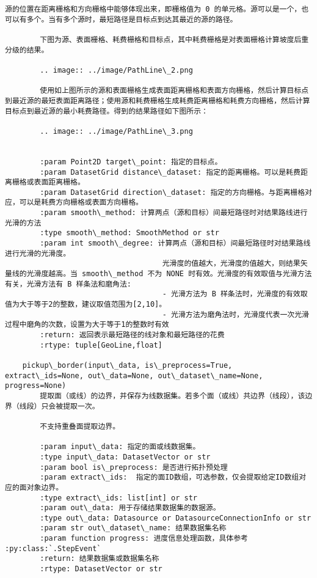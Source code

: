 \documentclass[11pt]{article}
\begin{document}
\begin{Verbatim}[commandchars=\\\{\}]
        源的位置在距离栅格和方向栅格中能够体现出来，即栅格值为 0 的单元格。源可以是一个，也可以有多个。当有多个源时，最短路径是目标点到达其最近的源的路径。
        
        下图为源、表面栅格、耗费栅格和目标点，其中耗费栅格是对表面栅格计算坡度后重分级的结果。
        
        .. image:: ../image/PathLine\_2.png
        
        使用如上图所示的源和表面栅格生成表面距离栅格和表面方向栅格，然后计算目标点到最近源的最短表面距离路径；使用源和耗费栅格生成耗费距离栅格和耗费方向栅格，然后计算目标点到最近源的最小耗费路径。得到的结果路径如下图所示：
        
        .. image:: ../image/PathLine\_3.png
        
        
        :param Point2D target\_point: 指定的目标点。
        :param DatasetGrid distance\_dataset: 指定的距离栅格。可以是耗费距离栅格或表面距离栅格。
        :param DatasetGrid direction\_dataset: 指定的方向栅格。与距离栅格对应，可以是耗费方向栅格或表面方向栅格。
        :param smooth\_method: 计算两点（源和目标）间最短路径时对结果路线进行光滑的方法
        :type smooth\_method: SmoothMethod or str
        :param int smooth\_degree: 计算两点（源和目标）间最短路径时对结果路线进行光滑的光滑度。
                                    光滑度的值越大，光滑度的值越大，则结果矢量线的光滑度越高。当 smooth\_method 不为 NONE 时有效。光滑度的有效取值与光滑方法有关，光滑方法有 B 样条法和磨角法:
                                    - 光滑方法为 B 样条法时，光滑度的有效取值为大于等于2的整数，建议取值范围为[2,10]。
                                    - 光滑方法为磨角法时，光滑度代表一次光滑过程中磨角的次数，设置为大于等于1的整数时有效
        :return: 返回表示最短路径的线对象和最短路径的花费
        :rtype: tuple[GeoLine,float]
    
    pickup\_border(input\_data, is\_preprocess=True, extract\_ids=None, out\_data=None, out\_dataset\_name=None, progress=None)
        提取面（或线）的边界，并保存为线数据集。若多个面（或线）共边界（线段），该边界（线段）只会被提取一次。
        
        不支持重叠面提取边界。
        
        :param input\_data: 指定的面或线数据集。
        :type input\_data: DatasetVector or str
        :param bool is\_preprocess: 是否进行拓扑预处理
        :param extract\_ids:  指定的面ID数组，可选参数，仅会提取给定ID数组对应的面对象边界。
        :type extract\_ids: list[int] or str
        :param out\_data: 用于存储结果数据集的数据源。
        :type out\_data: Datasource or DatasourceConnectionInfo or str
        :param str out\_dataset\_name: 结果数据集名称
        :param function progress: 进度信息处理函数，具体参考 :py:class:`.StepEvent`
        :return: 结果数据集或数据集名称
        :rtype: DatasetVector or str
    

\end{Verbatim}
\end{document}
